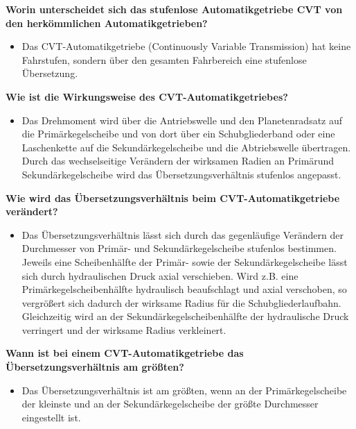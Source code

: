 \textbf{Worin unterscheidet sich das stufenlose Automatikgetriebe CVT
von den herkömmlichen Automatikgetrieben?}

\begin{itemize}
\item
  Das CVT-Automatikgetriebe (Continuously Variable Transmission) hat
  keine Fahrstufen, sondern über den gesamten Fahrbereich eine
  stufenlose Übersetzung.
\end{itemize}

\textbf{Wie ist die Wirkungsweise des CVT-Automatikgetriebes?}

\begin{itemize}
\item
  Das Drehmoment wird über die Antriebswelle und den Planetenradsatz auf
  die Primärkegelscheibe und von dort über ein Schubgliederband oder
  eine Laschenkette auf die Sekundärkegelscheibe und die Abtriebswelle
  übertragen. Durch das wechselseitige Verändern der wirksamen Radien an
  Primärund Sekundärkegelscheibe wird das Übersetzungsverhältnis
  stufenlos angepasst.
\end{itemize}

\textbf{Wie wird das Übersetzungsverhältnis beim CVT-Automatikgetriebe
verändert?}

\begin{itemize}
\item
  Das Übersetzungsverhältnis lässt sich durch das gegenläufige Verändern
  der Durchmesser von Primär- und Sekundärkegelscheibe stufenlos
  bestimmen. Jeweils eine Scheibenhälfte der Primär- sowie der
  Sekundärkegelscheibe lässt sich durch hydraulischen Druck axial
  verschieben. Wird z.B. eine Primärkegelscheibenhälfte hydraulisch
  beaufschlagt und axial verschoben, so vergrößert sich dadurch der
  wirksame Radius für die Schubgliederlaufbahn. Gleichzeitig wird an der
  Sekundärkegelscheibenhälfte der hydraulische Druck verringert und der
  wirksame Radius verkleinert.
\end{itemize}

\textbf{Wann ist bei einem CVT-Automatikgetriebe das
Übersetzungsverhältnis am größten?}

\begin{itemize}
\item
  Das Übersetzungsverhältnis ist am größten, wenn an der
  Primärkegelscheibe der kleinste und an der Sekundärkegelscheibe der
  größte Durchmesser eingestellt ist.
\end{itemize}

